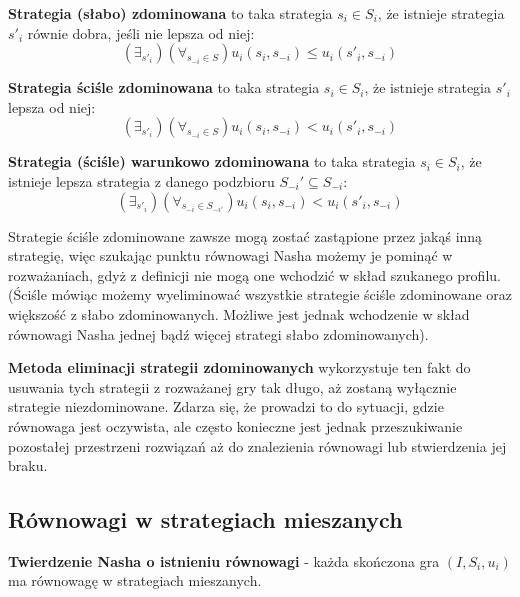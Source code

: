 \documentclass[polish]{standalone}
\begin{document}
\begin{definition}
\textbf{Strategia (słabo) zdominowana} to taka strategia $s_i \in S_i$, że istnieje strategia $s'_i$ równie dobra,
jeśli nie lepsza od niej:
$$(\exists_{s'_i}) (\forall_{s_{-i} \in S}) u_i(s_i, s_{-i}) \leq u_i(s'_i, s_{-i})$$
\cite[str.~6--7]{FT-GT}
\end{definition}

\begin{definition}
\textbf{Strategia ściśle zdominowana} to taka strategia $s_i \in S_i$, że istnieje strategia $s'_i$ lepsza od niej:
$$(\exists_{s'_i}) (\forall_{s_{-i} \in S}) u_i(s_i, s_{-i}) < u_i(s'_i, s_{-i})$$
\cite[str.~6--7]{FT-GT}
\end{definition}

\begin{definition}
\textbf{Strategia (ściśle) warunkowo zdominowana} to taka strategia $s_i \in S_i$, że istnieje lepsza strategia z danego
podzbioru $S_{-i}' \subseteq S_{-i}$:
$$(\exists_{s'_i}) (\forall_{s_{-i} \in S_{-i'}}) u_i(s_i, s_{-i}) < u_i(s'_i, s_{-i})$$
\cite[str.~2]{PNS-NE}
\end{definition}

Strategie ściśle zdominowane zawsze mogą zostać zastąpione przez jakąś inną strategię, więc szukając punktu równowagi
Nasha możemy je pominąć w rozważaniach, gdyż z definicji nie mogą one wchodzić w skład szukanego profilu. (Ściśle
mówiąc możemy wyeliminować wszystkie strategie ściśle zdominowane oraz większość z słabo zdominowanych. Możliwe jest
jednak wchodzenie w skład równowagi Nasha jednej bądź więcej strategi słabo zdominowanych).

\textbf{Metoda eliminacji strategii zdominowanych} wykorzystuje ten fakt do usuwania tych strategii z rozważanej gry
tak długo, aż zostaną wyłącznie strategie niezdominowane. Zdarza się, że prowadzi to do sytuacji, gdzie równowaga jest
oczywista, ale często konieczne jest jednak przeszukiwanie pozostałej przestrzeni rozwiązań aż do znalezienia
równowagi lub stwierdzenia jej braku.

\subsection{Równowagi w strategiach mieszanych}

\begin{theorem}
\textbf{Twierdzenie Nasha o istnieniu równowagi} - każda skończona gra $(I, S_i, u_i)$ ma równowagę w strategiach
mieszanych.
\cite[str.~29]{FT-GT}
\end{theorem}
\end{document}
